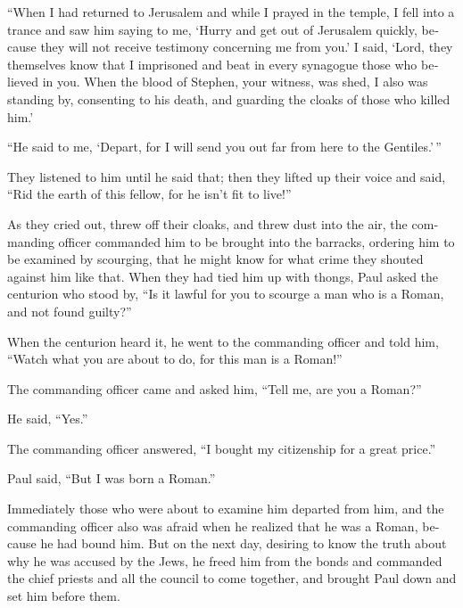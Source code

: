 \begin{paracol}{2}
\begin{otherlanguage}{english}
 ``When I had returned to Jerusalem and while I prayed in
the temple, I fell into a trance  and saw him saying to
me, `Hurry and get out of Jerusalem quickly, because they will not
receive testimony concerning me from you.'  I said,
`Lord, they themselves know that I imprisoned and beat in every
synagogue those who believed in you.  When the blood of
Stephen, your witness, was shed, I also was standing by, consenting to
his death, and guarding the cloaks of those who killed him.'

 ``He said to me, `Depart, for I will send you out far
from here to the Gentiles.'\,''

 They listened to him until he said that; then they
lifted up their voice and said, ``Rid the earth of this fellow, for he
isn't fit to live!''

 As they cried out, threw off their cloaks, and threw
dust into the air,  the commanding officer commanded him
to be brought into the barracks, ordering him to be examined by
scourging, that he might know for what crime they shouted against him
like that.  When they had tied him up with thongs, Paul
asked the centurion who stood by, ``Is it lawful for you to scourge a
man who is a Roman, and not found guilty?''

 When the centurion heard it, he went to the commanding
officer and told him, ``Watch what you are about to do, for this man is
a Roman!''

 The commanding officer came and asked him, ``Tell me,
are you a Roman?''

He said, ``Yes.''

 The commanding officer answered, ``I bought my
citizenship for a great price.''

Paul said, ``But I was born a Roman.''

 Immediately those who were about to examine him departed
from him, and the commanding officer also was afraid when he realized
that he was a Roman, because he had bound him.  But on
the next day, desiring to know the truth about why he was accused by the
Jews, he freed him from the bonds and commanded the chief priests and
all the council to come together, and brought Paul down and set him
before them.

\end{otherlanguage}


\end{paracol}
